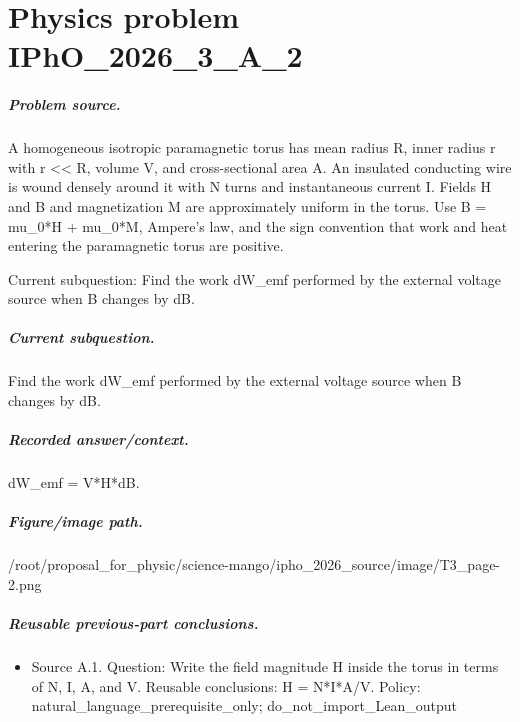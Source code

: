 
\chapter{Physics problem IPhO\_2026\_3\_A\_2}
\label{ch:IPhO2026Problems_problem_IPhO_2026_3_A_2}

\paragraph{Problem source.}
A homogeneous isotropic paramagnetic torus has mean radius R, inner radius r
with r << R, volume V, and cross-sectional area A.  An insulated conducting
wire is wound densely around it with N turns and instantaneous current I.
Fields H and B and magnetization M are approximately uniform in the torus.
Use B = mu\_0*H + mu\_0*M, Ampere's law, and the sign convention that work and
heat entering the paramagnetic torus are positive.

Current subquestion:
Find the work dW\_emf performed by the external voltage source when B changes by dB.

\paragraph{Current subquestion.}
Find the work dW\_emf performed by the external voltage source when B changes by dB.

\paragraph{Recorded answer/context.}
dW\_emf = V*H*dB.

\paragraph{Figure/image path.}
/root/proposal\_for\_physic/science-mango/ipho\_2026\_source/image/T3\_page-2.png

\paragraph{Reusable previous-part conclusions.}
\begin{itemize}
\item Source A.1. Question: Write the field magnitude H inside the torus in terms of N, I, A, and V. Reusable conclusions: H = N*I*A/V. Policy: natural\_language\_prerequisite\_only; do\_not\_import\_Lean\_output
\end{itemize}

